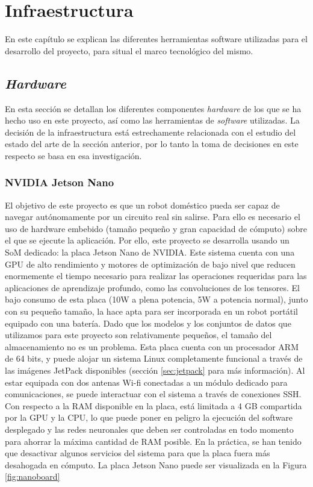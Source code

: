 \chapter{Infraestructura}

En este capítulo se explican las diferentes herramientas software utilizadas para el desarrollo del proyecto, para situal el marco tecnológico del mismo.

\section{\textit{Hardware}}

En esta sección se detallan los diferentes componentes \textit{hardware} de los que se ha hecho uso en este proyecto, así como las herramientas de \textit{software} utilizadas. La decisión de la infraestructura está estrechamente relacionada con el estudio del estado del arte de la sección anterior, por lo tanto la toma de decisiones en este respecto se basa en esa investigación.

\subsection{NVIDIA Jetson Nano}

El objetivo de este proyecto es que un robot doméstico pueda ser capaz de navegar autónomamente por un circuito real sin salirse. Para ello es necesario el uso de hardware embebido (tamaño pequeño y gran capacidad de cómputo) sobre el que se ejecute la aplicación. Por ello, este proyecto se desarrolla usando un SoM dedicado: la placa Jetson Nano de NVIDIA. Este sistema cuenta con una GPU de alto rendimiento y motores de optimización de bajo nivel que reducen enormemente el tiempo necesario para realizar las operaciones requeridas para las aplicaciones de aprendizaje profundo, como las convoluciones de los tensores. El bajo consumo de esta placa (10W a plena potencia, 5W a potencia normal), junto con su pequeño tamaño, la hace apta para ser incorporada en un robot portátil equipado con una batería. 
Dado que los modelos y los conjuntos de datos que utilizamos para este proyecto son relativamente pequeños, el tamaño del almacenamiento no es un problema. Esta placa cuenta con un procesador ARM de 64 bits, y puede alojar un sistema Linux completamente funcional a través de las imágenes JetPack disponibles (sección \ref{sec:jetpack} para más información). Al estar equipada con dos antenas Wi-fi conectadas a un módulo dedicado para comunicaciones, se puede interactuar con el sistema a través de conexiones SSH. Con respecto a la RAM disponible en la placa, está limitada a 4 GB compartida por la GPU y la CPU, lo que puede poner en peligro la ejecución del software desplegado y las redes neuronales que deben ser controladas en todo momento para ahorrar la máxima cantidad de RAM posible. En la práctica, se han tenido que desactivar algunos servicios del sistema para que la placa fuera más desahogada en cómputo. La placa Jetson Nano puede ser visualizada en la Figura \ref{fig:nanoboard}


